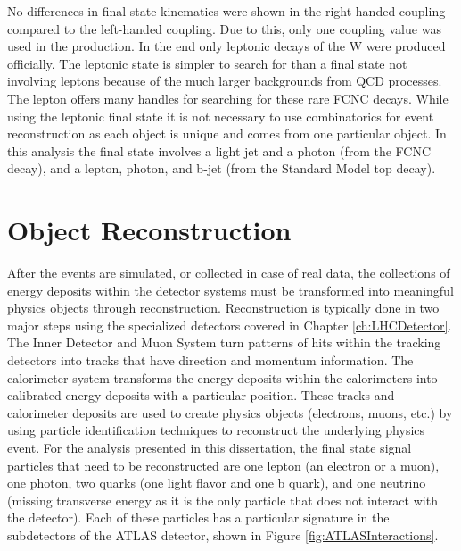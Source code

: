 No differences in final state kinematics were shown in the right-handed coupling compared to the left-handed coupling.  Due to this, only one coupling value was used in the production.  In the end only leptonic decays of the W were produced officially.  The leptonic state is simpler to search for than a final state not involving leptons because of the much larger backgrounds from QCD processes.  The lepton offers many handles for searching for these rare FCNC decays.  While using the leptonic final state it is not necessary to use combinatorics for event reconstruction as each object is unique and comes from one particular object.  In this analysis the final state involves a light jet and a photon (from the FCNC decay), and a lepton, photon, and b-jet (from the Standard Model top decay).




\section{Object Reconstruction}

After the events are simulated, or collected in case of real data, the collections of energy deposits within the detector systems must be transformed into meaningful physics objects through reconstruction.  Reconstruction is typically done in two major steps using the specialized detectors covered in Chapter \ref{ch:LHCDetector}.  The Inner Detector and Muon System turn patterns of hits within the tracking detectors into tracks that have direction and momentum information.  The calorimeter system transforms the energy deposits within the calorimeters into calibrated energy deposits with a particular position.  These tracks and calorimeter deposits are used to create physics objects (electrons, muons, etc.) by using particle identification techniques to reconstruct the underlying physics event.  For the analysis presented in this dissertation, the final state signal particles that need to be reconstructed are one lepton (an electron or a muon), one photon, two quarks (one light flavor and one b quark), and one neutrino (missing transverse energy as it is the only particle that does not interact with the detector).  Each of these particles has a particular signature in the subdetectors of the ATLAS detector, shown in Figure \ref{fig:ATLASInteractions}.

